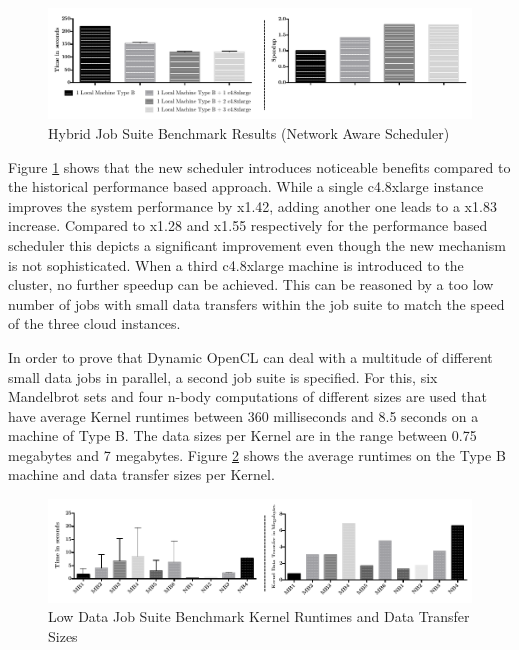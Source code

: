 \begin{figure}[!htb]
	\includegraphics[width=1.0\textwidth]{images/hybrid_full_benchmark_network_based.pdf}
	\centering
	\caption{Hybrid Job Suite  Benchmark Results (Network Aware Scheduler)}
	\label{img:hybrid_benchmark_results_network_aware}
\end{figure}

Figure \ref{img:hybrid_benchmark_results_network_aware} shows that the new scheduler introduces noticeable benefits compared to the historical performance based approach. While a single c4.8xlarge instance improves the system performance by x1.42, adding another one leads to a x1.83 increase. Compared to x1.28 and x1.55 respectively for the performance based scheduler this depicts a significant improvement even though the new mechanism is not sophisticated. When a third c4.8xlarge machine is introduced to the cluster, no further speedup can be achieved. This can be reasoned by a too low number of jobs with small data transfers within the job suite to match the speed of the three cloud instances.

In order to prove that Dynamic OpenCL can deal with a multitude of different small data jobs in parallel, a second job suite is specified. For this, six Mandelbrot sets and four n-body computations of different sizes are used that have average Kernel runtimes between 360 milliseconds and 8.5 seconds on a machine of Type B. The data sizes per Kernel are in the range between 0.75 megabytes and 7 megabytes. Figure \ref{img:low_data_benchmark_statistics} shows the average runtimes on the Type B machine and data transfer sizes per Kernel.

\begin{figure}[!htb]
	\includegraphics[width=1.0\textwidth]{images/lowdata_benchmark_statistics.pdf}
	\centering
	\caption{Low Data Job Suite Benchmark Kernel Runtimes and Data Transfer Sizes}
	\label{img:low_data_benchmark_statistics}
\end{figure}

